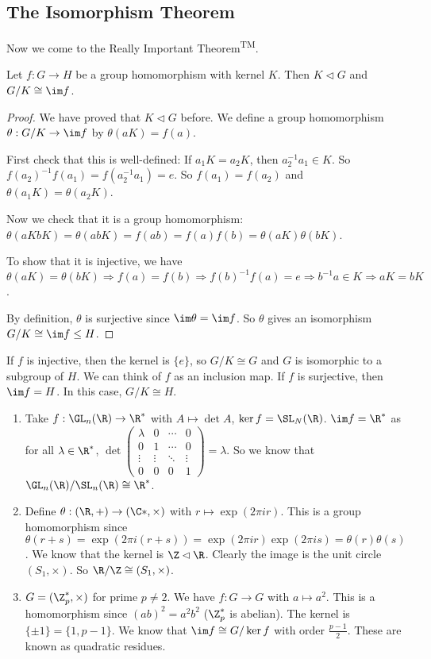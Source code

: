 \documentclass[a4paper]{article}
\begin{document}
\subsection{The Isomorphism Theorem}
Now we come to the Really Important Theorem\textsuperscript{TM}.
\begin{thm}
  Let $f:G\to H$ be a group homomorphism with kernel $K$. Then $K\lhd G$ and $G/K\cong \im f$.
\end{thm}

\begin{proof}
  We have proved that $K\lhd G$ before. We define a group homomorphism $\theta: G/K\to \im f$ by $\theta(aK) = f(a)$.

  First check that this is well-defined: If $a_1K = a_2K$, then $a_2^{-1}a_1\in K$. So $f(a_2)^{-1}f(a_1) = f(a_2^{-1}a_1) = e$. So $f(a_1) = f(a_2)$ and $\theta(a_1K) = \theta(a_2 K)$.

  Now we check that it is a group homomorphism: $\theta(aKbK) = \theta(abK) = f(ab) = f(a)f(b) = \theta(aK) \theta(bK)$.

  To show that it is injective, we have $\theta(aK) = \theta(bK) \Rightarrow f(a) = f(b) \Rightarrow f(b)^{-1}f(a)=e\Rightarrow b^{-1}a\in K \Rightarrow aK = bK$.

  By definition, $\theta$ is surjective since $\im \theta = \im f$. So $\theta$ gives an isomorphism $G/K \cong \im f \leq H$.
\end{proof}
If $f$ is injective, then the kernel is $\{e\}$, so $G/K\cong G$ and $G$ is isomorphic to a subgroup of $H$. We can think of $f$ as an inclusion map. If $f$ is surjective, then $\im f = H$. In this case, $G/K \cong H$.

\begin{eg}\leavevmode
  \begin{enumerate}
    \item Take $f: \GL_n(\R) \to \R^*$ with $A \mapsto \det A$, $\ker f = \SL_N(\R)$. $\im f = \R^*$ as for all $\lambda \in \R^*$, $\det
      \begin{pmatrix}
        \lambda & 0 & \cdots & 0 \\
        0 &1 & \cdots & 0\\
        \vdots &\vdots &\ddots & \vdots\\
        0& 0 & 0 &1
      \end{pmatrix}
      = \lambda$. So we know that $\GL_n(\R)/\SL_n(\R) \cong \R^*$.
    \item Define $\theta: (\R, +) \to (\C*, \times)$ with $r\mapsto \exp(2\pi ir)$. This is a group homomorphism since $\theta(r + s) = \exp(2\pi i(r + s)) = \exp (2\pi i r)\exp (2\pi i s) = \theta(r)\theta(s)$. We know that the kernel is $\Z\lhd \R$. Clearly the image is the unit circle $(S_1, \times)$. So $\R/\Z \cong (S_1, \times)$.
    \item $G = (\Z_p^*, \times)$ for prime $p\not= 2$. We have $f: G\to G$ with $a\mapsto a^2$. This is a homomorphism since $(ab)^2 = a^2b^2$ ($\Z_p^*$ is abelian). The kernel is $\{\pm 1\} = \{1, p - 1\}$. We know that $\im f\cong G/\ker f$ with order $\frac{p - 1}{2}$. These are known as quadratic residues.
  \end{enumerate}
\end{eg}
\end{document}
